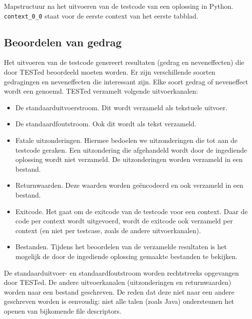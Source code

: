 \begin{listing}
    \inputminted{text}{code/dir-listing.txt}
    \caption{Mapstructuur na het uitvoeren van de testcode van een oplossing in Python.
    \texttt{context\_0\_0} staat voor de eerste context van het eerste tabblad.
    }
    \label{lst:mapstructuur}
\end{listing}

\subsection{Beoordelen van gedrag}\label{subsec:beoordelen-van-gedrag}

Het uitvoeren van de testcode genereert resultaten (gedrag en neveneffecten) die door TESTed beoordeeld moeten worden.
Er zijn verschillende soorten gedragingen en neveneffecten die interessant zijn.
Elke soort gedrag of neveneffect wordt een  genoemd.
TESTed verzamelt volgende uitvoerkanalen:
\begin{itemize}
    \item De standaarduitvoerstroom.
    Dit wordt verzameld als tekstuele uitvoer.
    \item De standaardfoutstroom.
    Ook dit wordt als tekst verzameld.
    \item Fatale uitzonderingen.
    Hiermee bedoelen we uitzonderingen die tot aan de testcode geraken.
    Een uitzondering die afgehandeld wordt door de ingediende oplossing wordt niet verzameld.
    De uitzonderingen worden verzameld in een bestand.
    \item Returnwaarden.
    Deze waarden worden geëncodeerd en ook verzameld in een bestand.
    \item Exitcode.
    Het gaat om de exitcode van de testcode voor een context.
    Daar de code per context wordt uitgevoerd, wordt de exitcode ook verzameld per context (en niet per testcase, zoals de andere uitvoerkanalen).
    \item Bestanden.
    Tijdens het beoordelen van de verzamelde resultaten is het mogelijk de door de ingediende oplossing gemaakte bestanden te bekijken.
\end{itemize}

De standaarduitvoer- en standaardfoutstroom worden rechtstreeks opgevangen door TESTed.
De andere uitvoerkanalen (uitzonderingen en returnwaarden) worden naar een bestand geschreven.
De reden dat deze niet naar een andere  geschreven worden is eenvoudig: niet alle talen (zoals Java) ondersteunen het openen van bijkomende file descriptors.

